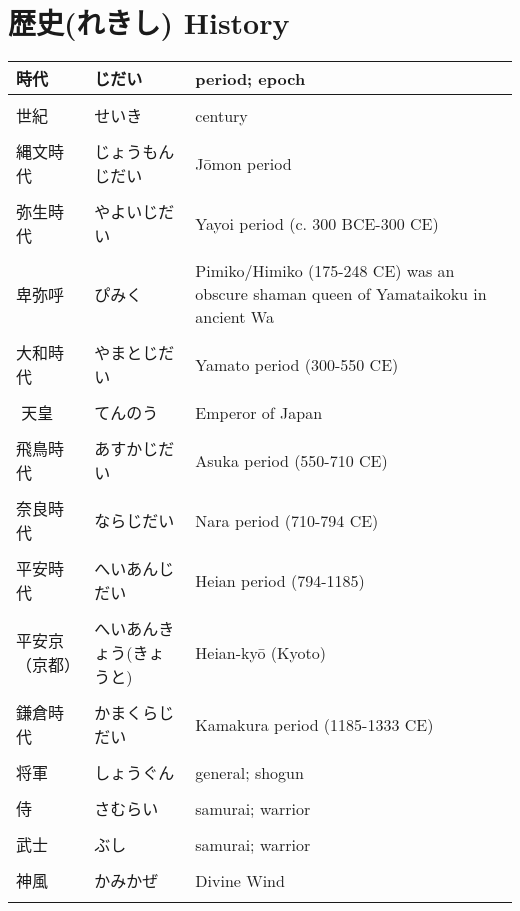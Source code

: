 \documentclass{article}
\begin{document}
 \large

\section*{歴史(れきし) History}
\begin{tabular}{l | l | p{10.5cm}}
時代 & じだい & period; epoch \\ \hline \\[-1em]
世紀 & せいき & century \\ \hline \\[-1em]
縄文時代 & じょうもんじだい & Jōmon period​ \\ \hline \\[-1em]
弥生時代 & やよいじだい & Yayoi period (c. 300 BCE-300 CE) \\ \hline \\[-1em]
卑弥呼 & ぴみく & Pimiko/Himiko (175-248 CE) was an obscure shaman queen of Yamataikoku in ancient Wa \\ \hline \\[-1em]
大和時代 & やまとじだい & Yamato period (300-550 CE) \\ \hline \\[-1em]​
天皇 & てんのう & Emperor of Japan​ \\ \hline \\[-1em]
飛鳥時代 & あすかじだい & Asuka period (550-710 CE)​ \\ \hline \\[-1em]
奈良時代 & ならじだい & Nara period (710-794 CE)​ \\ \hline \\[-1em]
平安時代 & へいあんじだい & Heian period (794-1185)​ \\ \hline \\[-1em]
平安京（京都） & へいあんきょう(きょうと) & Heian-kyō​ (Kyoto) \\ \hline \\[-1em]
鎌倉時代 & かまくらじだい & Kamakura period (1185-1333 CE)​ \\ \hline \\[-1em]
将軍 & しょうぐん & general; shogun \\ \hline \\[-1em]
侍 & さむらい & samurai; warrior \\ \hline \\[-1em]
武士 & ぶし & samurai; warrior \\ \hline \\[-1em]
神風 & かみかぜ & Divine Wind \\ \hline \\[-1em]

\end{tabular}
\end{document}
